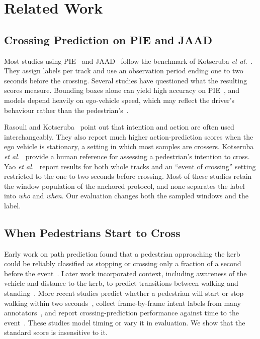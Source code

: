 \documentclass[10pt,a4paper,twocolumn]{article}
\begin{document}
\section{Related Work}
\label{sec:related}

\subsection{Crossing Prediction on PIE and JAAD}
Most studies using PIE~\cite{rasouli2019pie} and JAAD~\cite{rasouli2017jaad}
follow the benchmark of Kotseruba \emph{et al.}~\cite{kotseruba2021benchmark}.
They assign labels per track and use an observation period ending one to two
seconds before the crossing. Several studies have questioned what the
resulting scores measure. Bounding boxes alone can yield high accuracy on
PIE~\cite{achaji2022bbox}, and models depend heavily on ego-vehicle
speed, which may reflect the driver's behaviour rather than the
pedestrian's~\cite{azarmi2024feature}.

Rasouli and Kotseruba~\cite{rasouli2024diving} point out that intention and
action are often used interchangeably. They also report much higher
action-prediction scores when the ego vehicle is stationary, a setting in
which most samples are crossers. Kotseruba \emph{et al.}~\cite{kotseruba2020want}
provide a human reference for assessing a pedestrian's intention to cross. Yao
\emph{et al.}~\cite{yao2021coupling} report results for both whole tracks and
an ``event of crossing'' setting restricted to the one to two seconds before
crossing. Most of these studies retain the window population of the anchored
protocol, and none separates the label into \emph{who} and \emph{when}. Our
evaluation changes both the sampled windows and the label.

\subsection{When Pedestrians Start to Cross}
Early work on path prediction found that a pedestrian approaching the kerb
could be reliably classified as stopping or crossing only a fraction of a
second before the event~\cite{keller2014cross}. Later work incorporated
context, including awareness of the vehicle and distance to the kerb, to
predict transitions between walking and standing~\cite{kooij2014context}. More
recent studies predict whether a pedestrian will start or stop walking within
two seconds~\cite{guo2022stopgo}, collect frame-by-frame intent labels from
many annotators~\cite{jing2025psi}, and report crossing-prediction performance
against time to the event~\cite{gtranspdm2024}. These studies model timing or
vary it in evaluation. We show that the standard score is insensitive to it.
\end{document}

